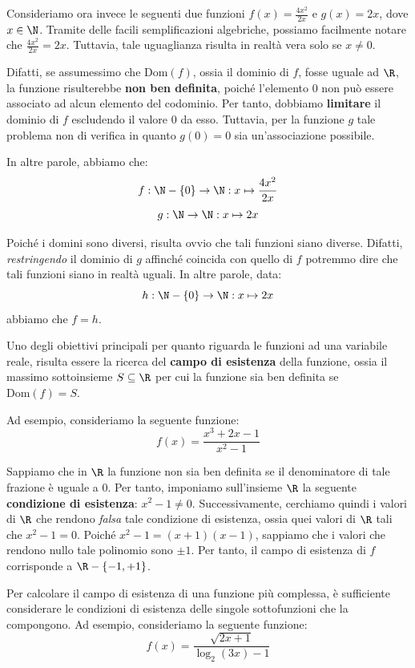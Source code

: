 \documentclass[a4paper, 12pt]{report}
\begin{document}
    Consideriamo ora invece le seguenti due funzioni $f(x) = \frac{4x^2}{2x}$ e $g(x) = 2x$, dove $x \in \N$. Tramite delle facili semplificazioni algebriche, possiamo facilmente notare che $\frac{4x^2}{2x} = 2x$. Tuttavia, tale uguaglianza risulta in realtà vera solo se $x \neq 0$.

    Difatti, se assumessimo che $\mathrm{Dom}(f)$, ossia il dominio di $f$, fosse uguale ad $\R$, la funzione risulterebbe \textbf{non ben definita}, poiché l'elemento $0$ non può essere associato ad alcun elemento del codominio. 
    Per tanto, dobbiamo \textbf{limitare} il dominio di $f$ escludendo il valore 0 da esso. Tuttavia, per la funzione $g$ tale problema non di verifica in quanto $g(0) = 0$ sia un'associazione possibile.

    In altre parole, abbiamo che:
    \[f : \N-\{0\} \to \N : x \mapsto \frac{4x^2}{2x}\]
    \[g : \N \to \N : x \mapsto 2x\]

    Poiché i domini sono diversi, risulta ovvio che tali funzioni siano diverse. Difatti, \textit{restringendo} il dominio di $g$ affinché coincida con quello di $f$ potremmo dire che tali funzioni siano in realtà uguali. In altre parole, data:
    \[h : \N-\{0\} \to \N : x \mapsto 2x\]
    abbiamo che $f = h$.

    Uno degli obiettivi principali per quanto riguarda le funzioni ad una variabile reale, risulta essere la ricerca del \textbf{campo di esistenza} della funzione, ossia il massimo sottoinsieme $S \subseteq \R$ per cui la funzione sia ben definita se $\mathrm{Dom}(f) = S$.

    Ad esempio, consideriamo la seguente funzione:
    \[f(x) = \frac{x^3+2x-1}{x^2-1}\]

    Sappiamo che in $\R$ la funzione non sia ben definita se il denominatore di tale frazione è uguale a 0. Per tanto, imponiamo sull'insieme $\R$ la seguente \textbf{condizione di esistenza}: $x^2-1 \neq 0$. Successivamente, cerchiamo quindi i valori di $\R$ che rendono \textit{falsa} tale condizione di esistenza, ossia quei valori di $\R$ tali che $x^2-1 = 0$. Poiché $x^2-1 = (x+1)(x-1)$, sappiamo che i valori che rendono nullo tale polinomio sono $\pm 1$. Per tanto, il campo di esistenza di $f$ corrisponde a $\R - \{-1, +1\}$.

    Per calcolare il campo di esistenza di una funzione più complessa, è sufficiente considerare le condizioni di esistenza delle singole sottofunzioni che la compongono. Ad esempio, consideriamo la seguente funzione:
    \[f(x) = \frac{\sqrt{2x+1}}{\log_2(3x)-1}\]
\end{document}
